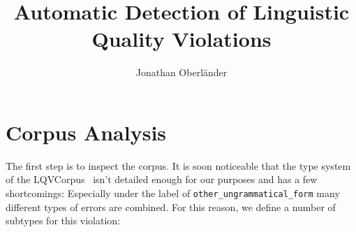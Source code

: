 \documentclass[a4paper,10pt]{scrartcl}
\author{Jonathan Oberländer}
\title{Automatic Detection of Linguistic Quality Violations}
\begin{document}
\maketitle









\section{Corpus Analysis}

The first step is to inspect the corpus. It is soon noticeable that the type system of the LQVCorpus~\citep{valeeva} isn't detailed enough for our purposes and has a few shortcomings: Especially under the label of \texttt{other\_ungrammatical\_form} many different types of errors are combined. For this reason, we define a number of subtypes for this violation:
\end{document}
